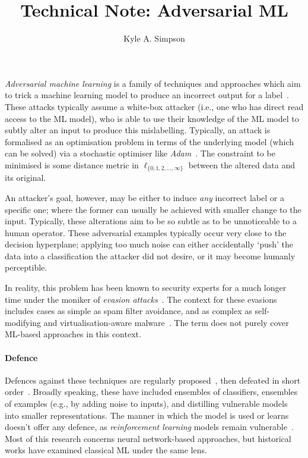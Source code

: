\documentclass[11pt,a4paper]{article}
\newcommand{\mytitle}{Technical Note: Adversarial ML}
\newcommand{\myname}{Kyle A. Simpson}
\begin{document}
\title{\mytitle{}}
\author{\myname{}}

\maketitle

\noindent
\emph{Adversarial machine learning} is a family of techniques and approaches which aim to trick a machine learning model to produce an incorrect output for a label~\parencite{DBLP:conf/eurosp/PapernotMSW18}.
These attacks typically assume a white-box attacker (i.e., one who has direct read access to the ML model), who is able to use their knowledge of the ML model to subtly alter an input to produce this mislabelling.
Typically, an attack is formalised as an optimisation problem in terms of the underlying model (which can be solved) via a stochastic optimiser like \emph{Adam}~\parencite{DBLP:journals/corr/KingmaB14}.
The constraint to be minimised is some distance metric in $\ell_{\{0,1,2,...,\infty\}}$ between the altered data and its original.

An attacker's goal, however, may be either to induce \emph{any} incorrect label or a specific one; where the former can usually be achieved with smaller change to the input.
Typically, these alterations aim to be so subtle as to be unnoticeable to a human operator.
These adversarial examples typically occur very close to the decision hyperplane; applying too much noise can either accidentally `push' the data into a classification the attacker did not desire, or it may become humanly perceptible.

In reality, this problem has been known to security experts for a much longer time under the moniker of \emph{evasion attacks}~\parencite{DBLP:conf/ccs/BarrenoNSJT06}.
The context for these evasions includes cases as simple as spam filter avoidance, and as complex as self-modifying and virtualisation-aware malware~\parencite{DBLP:conf/acsac/CoptyDEEMZ18}.
The term does not purely cover ML-based approaches in this context.

\paragraph{Defence}
Defences against these techniques are regularly proposed~\parencite{DBLP:conf/sp/PapernotM0JS16,DBLP:conf/ndss/SmutzS16,DBLP:conf/acsac/CaoG17,DBLP:conf/iclr/ZhangCXGSLBH20}, then defeated in short order~\parencite{DBLP:conf/sp/Carlini017,DBLP:journals/corr/abs-2002-04599}.
Broadly speaking, these have included ensembles of classifiers, ensembles of examples (e.g., by adding noise to inputs), and distilling vulnerable models into smaller representations.
The manner in which the model is used or learns doesn't offer any defence, as \emph{reinforcement learning} models remain vulnerable~\parencite{DBLP:journals/corr/HuangPGDA17}.
Most of this research concerns neural network-based approaches, but historical works have examined classical ML under the same lens.
\end{document}
